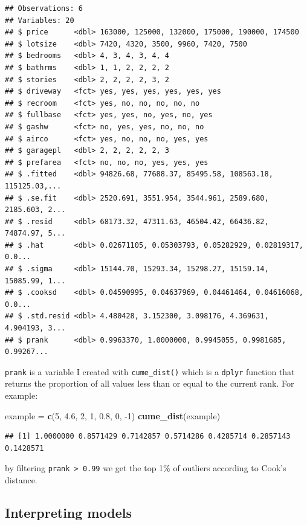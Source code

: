 \documentclass[]{gitbook}
\newenvironment{Shaded}{\begin{snugshade}}{\end{snugshade}}
\newcommand{\DecValTok}[1]{\textcolor[rgb]{0.00,0.00,0.81}{#1}}
\newcommand{\FloatTok}[1]{\textcolor[rgb]{0.00,0.00,0.81}{#1}}
\newcommand{\KeywordTok}[1]{\textcolor[rgb]{0.13,0.29,0.53}{\textbf{#1}}}
\newcommand{\NormalTok}[1]{#1}
\newcommand{\StringTok}[1]{\textcolor[rgb]{0.31,0.60,0.02}{#1}}
\theoremstyle{definition}
\theoremstyle{definition}
\theoremstyle{definition}
\theoremstyle{remark}
\begin{document}
\begin{verbatim}
## Observations: 6
## Variables: 20
## $ price      <dbl> 163000, 125000, 132000, 175000, 190000, 174500
## $ lotsize    <dbl> 7420, 4320, 3500, 9960, 7420, 7500
## $ bedrooms   <dbl> 4, 3, 4, 3, 4, 4
## $ bathrms    <dbl> 1, 1, 2, 2, 2, 2
## $ stories    <dbl> 2, 2, 2, 2, 3, 2
## $ driveway   <fct> yes, yes, yes, yes, yes, yes
## $ recroom    <fct> yes, no, no, no, no, no
## $ fullbase   <fct> yes, yes, no, yes, no, yes
## $ gashw      <fct> no, yes, yes, no, no, no
## $ airco      <fct> yes, no, no, no, yes, yes
## $ garagepl   <dbl> 2, 2, 2, 2, 2, 3
## $ prefarea   <fct> no, no, no, yes, yes, yes
## $ .fitted    <dbl> 94826.68, 77688.37, 85495.58, 108563.18, 115125.03,...
## $ .se.fit    <dbl> 2520.691, 3551.954, 3544.961, 2589.680, 2185.603, 2...
## $ .resid     <dbl> 68173.32, 47311.63, 46504.42, 66436.82, 74874.97, 5...
## $ .hat       <dbl> 0.02671105, 0.05303793, 0.05282929, 0.02819317, 0.0...
## $ .sigma     <dbl> 15144.70, 15293.34, 15298.27, 15159.14, 15085.99, 1...
## $ .cooksd    <dbl> 0.04590995, 0.04637969, 0.04461464, 0.04616068, 0.0...
## $ .std.resid <dbl> 4.480428, 3.152300, 3.098176, 4.369631, 4.904193, 3...
## $ prank      <dbl> 0.9963370, 1.0000000, 0.9945055, 0.9981685, 0.99267...
\end{verbatim}

\texttt{prank} is a variable I created with \texttt{cume\_dist()} which
is a \texttt{dplyr} function that returns the proportion of all values
less than or equal to the current rank. For example:

\begin{Shaded}
\begin{Highlighting}[]
\NormalTok{example =}\StringTok{ }\KeywordTok{c}\NormalTok{(}\DecValTok{5}\NormalTok{, }\FloatTok{4.6}\NormalTok{, }\DecValTok{2}\NormalTok{, }\DecValTok{1}\NormalTok{, }\FloatTok{0.8}\NormalTok{, }\DecValTok{0}\NormalTok{, }\DecValTok{-1}\NormalTok{)}
\KeywordTok{cume_dist}\NormalTok{(example)}
\end{Highlighting}
\end{Shaded}

\begin{verbatim}
## [1] 1.0000000 0.8571429 0.7142857 0.5714286 0.4285714 0.2857143 0.1428571
\end{verbatim}

by filtering \texttt{prank\ \textgreater{}\ 0.99} we get the top 1\% of
outliers according to Cook's distance.

\hypertarget{interpreting-models}{%
\subsection{Interpreting models}\label{interpreting-models}}
\end{document}
